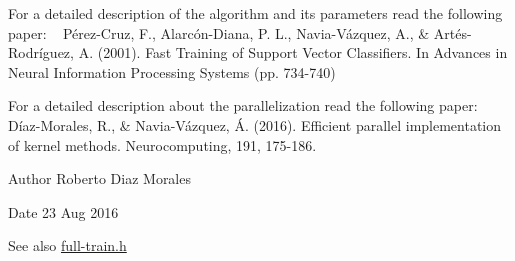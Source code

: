 For a detailed description of the algorithm and its parameters read the following paper\+: ~\newline
 Pérez-\/\+Cruz, F., Alarcón-\/\+Diana, P. L., Navia-\/\+Vázquez, A., \& Artés-\/\+Rodríguez, A. (2001). Fast Training of Support Vector Classifiers. In Advances in Neural Information Processing Systems (pp. 734-\/740)

For a detailed description about the parallelization read the following paper\+: ~\newline
Díaz-\/\+Morales, R., \& Navia-\/\+Vázquez, Á. (2016). Efficient parallel implementation of kernel methods. Neurocomputing, 191, 175-\/186.

\begin{DoxyAuthor}{Author}
Roberto Diaz Morales 
\end{DoxyAuthor}
\begin{DoxyDate}{Date}
23 Aug 2016 
\end{DoxyDate}
\begin{DoxySeeAlso}{See also}
\hyperlink{full-train_8h}{full-\/train.\+h} 
\end{DoxySeeAlso}
